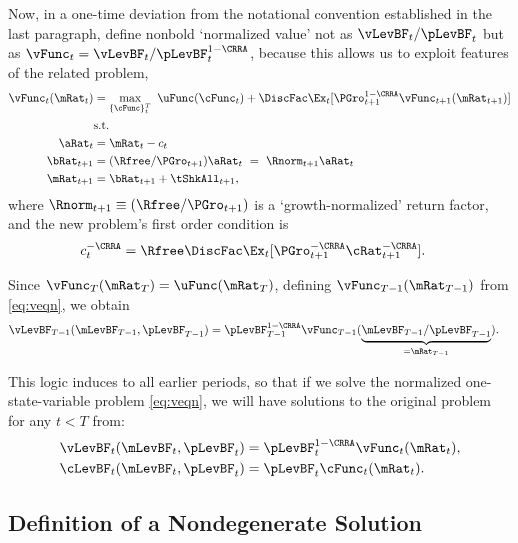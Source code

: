 \documentclass[BufferStockTheory]{subfiles}
\begin{document}
\hypertarget{The-Related-Problem}{}
Now, in a one-time deviation from the notational convention established in the last paragraph, define nonbold `normalized value' not as $\vLevBF_{t}/\pLevBF_{t}$ but as $\vFunc_{t} = \vLevBF_{t}/\pLevBF_{t}^{1-\CRRA}$, because this allows us to exploit features of the related problem,
\begin{align}
  \vFunc_{t}(\mRat_{t})  & = \max_{\{\cFunc\}_{t}^{T}}~  \uFunc(\cFunc_{t}) +\DiscFac \Ex_{t}[\PGro_{t+1}^{1-\CRRA}\vFunc_{t+1}({\mRat}_{t+1})] \notag \\
                         & \mbox{s.t.}  \label{eq:veqn} 
  \\ {\aRat}_{t}  & = \mRat_{t}-c_{t}  \notag
  \\ {\bRat}_{t+1}  & = (\Rfree/\PGro_{t+1})\aRat_{t}  ~ = ~ \Rnorm_{t+1}\aRat_{t}  \notag
  \\ \mRat_{t+1}  & = \bRat_{t+1}+\tShkAll_{t+1}  \notag, %
\end{align}
where $\Rnorm_{t+1}\equiv (\Rfree/\PGro_{t+1})$ is a `growth-normalized' return factor, and the new problem's first order condition is
\begin{align}
  c_{t}^{-\CRRA}  & = \Rfree \DiscFac \Ex_{t}[ {\PGro}_{t+1}^{-\CRRA} {\cRat}
                    _{t+1}^{-\CRRA}].  \label{eq:scaledeuler}
\end{align}

Since $\vFunc_{T}(\mRat_{T}) = \uFunc(\mRat_{T})$, defining $\vFunc_{T-1}(\mRat_{T-1})$ from \eqref{eq:veqn}, we obtain
\begin{align*}
  \vLevBF_{T-1}(\mLevBF_{T-1},\pLevBF_{T-1})  & = \pLevBF_{T-1}^{1-\CRRA} \vFunc_{T-1}(\underbrace{\mLevBF_{T-1}/\pLevBF_{T-1}}_{=\mRat_{T-1}}).
\end{align*}

This logic induces to all earlier periods, so that if we solve the
normalized one-state-variable problem \eqref{eq:veqn}, we
will have solutions to the original problem for any $t<T$
from:
\begin{align*}
  \vLevBF_{t}(\mLevBF_{t},\pLevBF_{t})  & = \pLevBF_{t}^{1-\CRRA}\vFunc_{t}(\mRat_{t}),
  \\ \cLevBF_{t}(\mLevBF_{t},\pLevBF_{t})  & = \pLevBF_{t}\cFunc_{t}(\mRat_{t}).
\end{align*}

\hypertarget{Definition-of-a-Nondegenerate-Solution}{}
\subsection{Definition of a Nondegenerate Solution}
\end{document}
